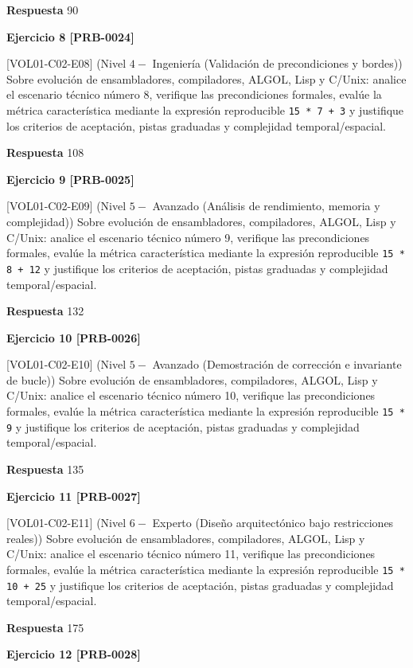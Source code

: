 \documentclass{book}
\begin{document}
\noindent\textbf{Respuesta} 90

\noindent\textbf{Ejercicio 8 [PRB-0024]}

[VOL01-C02-E08] (Nivel \(4 -\) Ingeniería (Validación de precondiciones y bordes)) Sobre evolución de ensambladores, compiladores, ALGOL, Lisp y C/Unix: analice el escenario técnico número 8, verifique las precondiciones formales, evalúe la métrica característica mediante la expresión reproducible \texttt{15 * 7 + 3} y justifique los criterios de aceptación, pistas graduadas y complejidad temporal/espacial.

\noindent\textbf{Respuesta} 108

\noindent\textbf{Ejercicio 9 [PRB-0025]}

[VOL01-C02-E09] (Nivel \(5 -\) Avanzado (Análisis de rendimiento, memoria y complejidad)) Sobre evolución de ensambladores, compiladores, ALGOL, Lisp y C/Unix: analice el escenario técnico número 9, verifique las precondiciones formales, evalúe la métrica característica mediante la expresión reproducible \texttt{15 * 8 + 12} y justifique los criterios de aceptación, pistas graduadas y complejidad temporal/espacial.

\noindent\textbf{Respuesta} 132

\noindent\textbf{Ejercicio 10 [PRB-0026]}

[VOL01-C02-E10] (Nivel \(5 -\) Avanzado (Demostración de corrección e invariante de bucle)) Sobre evolución de ensambladores, compiladores, ALGOL, Lisp y C/Unix: analice el escenario técnico número 10, verifique las precondiciones formales, evalúe la métrica característica mediante la expresión reproducible \texttt{15 * 9} y justifique los criterios de aceptación, pistas graduadas y complejidad temporal/espacial.

\noindent\textbf{Respuesta} 135

\noindent\textbf{Ejercicio 11 [PRB-0027]}

[VOL01-C02-E11] (Nivel \(6 -\) Experto (Diseño arquitectónico bajo restricciones reales)) Sobre evolución de ensambladores, compiladores, ALGOL, Lisp y C/Unix: analice el escenario técnico número 11, verifique las precondiciones formales, evalúe la métrica característica mediante la expresión reproducible \texttt{15 * 10 + 25} y justifique los criterios de aceptación, pistas graduadas y complejidad temporal/espacial.

\noindent\textbf{Respuesta} 175

\noindent\textbf{Ejercicio 12 [PRB-0028]}
\end{document}
